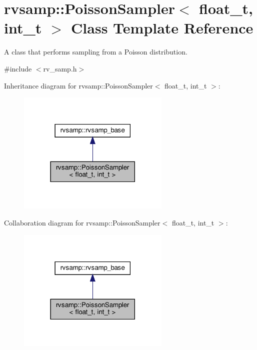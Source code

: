 \hypertarget{classrvsamp_1_1PoissonSampler}{}\section{rvsamp\+:\+:Poisson\+Sampler$<$ float\+\_\+t, int\+\_\+t $>$ Class Template Reference}
\label{classrvsamp_1_1PoissonSampler}


A class that performs sampling from a Poisson distribution.  




{\ttfamily \#include $<$rv\+\_\+samp.\+h$>$}



Inheritance diagram for rvsamp\+:\+:Poisson\+Sampler$<$ float\+\_\+t, int\+\_\+t $>$\+:
\nopagebreak
\begin{figure}[H]
\begin{center}
\leavevmode
\includegraphics[width=206pt]{classrvsamp_1_1PoissonSampler__inherit__graph}
\end{center}
\end{figure}


Collaboration diagram for rvsamp\+:\+:Poisson\+Sampler$<$ float\+\_\+t, int\+\_\+t $>$\+:
\nopagebreak
\begin{figure}[H]
\begin{center}
\leavevmode
\includegraphics[width=206pt]{classrvsamp_1_1PoissonSampler__coll__graph}
\end{center}
\end{figure}

